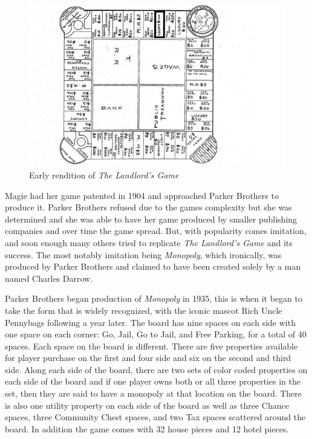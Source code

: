 \documentclass{article}
\begin{document}
\begin{figure}
    \includegraphics[width=6.0in]{landlordsgame}
    \caption{Early rendition of \textit{The Landlord's Game}\cite{landlordpicture}}
    \label{landlordsgame_image}
\end{figure}


Magie had her game patented in 1904 and approached Parker Brothers to produce it.  Parker Brothers refused due to the games complexity but she was determined and she was able to have her game produced by smaller publishing companies and over time the game spread. But, with popularity comes imitation, and soon enough many others tried to replicate \textit{The Landlord’s Game} and its success.  The most notably imitation being \textit{Monopoly}, which ironically, was produced by Parker Brothers and claimed to have been created solely by a man named Charles Darrow.\cite{monopolyhistory}

Parker Brothers began production of \textit{Monopoly} in 1935, this is when it began to take the form that is widely recognized, with the iconic mascot Rich Uncle Pennybags following a year later.\cite{monopolyhistory}  The board has nine spaces on each side with one space on each corner: Go, Jail, Go to Jail, and Free Parking, for a total of 40 spaces.  Each space on the board is different. There are five properties available for player purchase on the first and four side and six on the second and third side.  Along each side of the board, there are two sets of color coded properties on each side of the board and if one player owns both or all three properties in the set, then they are said to have a monopoly at that location on the board.  There is also one utility property on each side of the board as well as three Chance spaces, three Community Chest spaces, and two Tax spaces scattered around the board.  In addition the game comes with 32 house pieces and 12 hotel pieces.\cite{rules}
\end{document}

